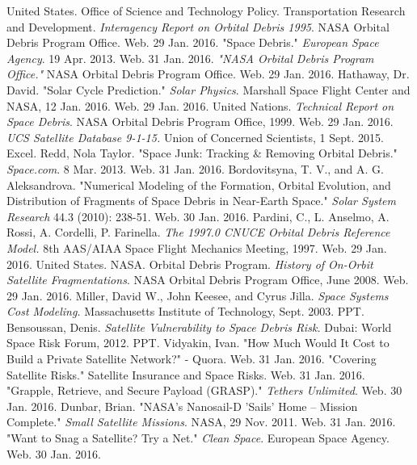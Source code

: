 \documentclass[12pt]{scrartcl}
\begin{document}
\begingroup
\renewcommand{\section}[2]{}%
\begin{thebibliography}{50}

United States. Office of Science and Technology Policy. Transportation Research and Development. \textit{Interagency Report on Orbital Debris 1995}. NASA Orbital Debris Program Office. Web. 29 Jan. 2016.
"Space Debris." \textit{European Space Agency}. 19 Apr. 2013. Web. 31 Jan. 2016.
\textit{"NASA Orbital Debris Program Office."} NASA Orbital Debris Program Office. Web. 29 Jan. 2016.
Hathaway, Dr. David. "Solar Cycle Prediction." \textit{Solar Physics}. Marshall Space Flight Center and NASA, 12 Jan. 2016. Web. 29 Jan. 2016.
United Nations. \textit{Technical Report on Space Debris}. NASA Orbital Debris Program Office, 1999. Web. 29 Jan. 2016.
\textit{UCS Satellite Database 9-1-15.} Union of Concerned Scientists, 1 Sept. 2015. Excel.
Redd, Nola Taylor. "Space Junk: Tracking \& Removing Orbital Debris." \textit{Space.com}. 8 Mar. 2013. Web. 31 Jan. 2016.
Bordovitsyna, T. V., and A. G. Aleksandrova. "Numerical Modeling of the Formation, Orbital Evolution, and Distribution of Fragments of Space Debris in Near-Earth Space." \textit{Solar System Research} 44.3 (2010): 238-51. Web. 30 Jan. 2016.
Pardini, C., L. Anselmo, A. Rossi, A. Cordelli, P. Farinella. \textit{The 1997.0 CNUCE Orbital Debris Reference Model.} 8th AAS/AIAA Space Flight Mechanics Meeting, 1997. Web. 29 Jan. 2016. 
United States. NASA. Orbital Debris Program. \textit{History of On-Orbit Satellite Fragmentations}. NASA Orbital Debris Program Office, June 2008. Web. 29 Jan. 2016.
Miller, David W., John Keesee, and Cyrus Jilla. \textit{Space Systems Cost Modeling.} Massachusetts Institute of Technology, Sept. 2003. PPT.
Bensoussan, Denis. \textit{Satellite Vulnerability to Space Debris Risk.} Dubai: World Space Risk Forum, 2012. PPT.
Vidyakin, Ivan. "How Much Would It Cost to Build a Private Satellite Network?" - Quora. Web. 31 Jan. 2016.
"Covering Satellite Risks." Satellite Insurance and Space Risks. Web. 31 Jan. 2016.
"Grapple, Retrieve, and Secure Payload (GRASP)." \textit{Tethers Unlimited}. Web. 30 Jan. 2016.
Dunbar, Brian. "NASA's Nanosail-D 'Sails' Home -- Mission Complete." \textit{Small Satellite Missions}. NASA, 29 Nov. 2011. Web. 31 Jan. 2016.
"Want to Snag a Satellite? Try a Net." \textit{Clean Space}. European Space Agency. Web. 30 Jan. 2016.
\end{thebibliography}
\endgroup
\end{document}
